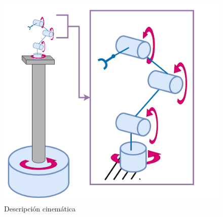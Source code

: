 \begin{figure}[H]
    \centering
    \includegraphics[scale=0.3]{Figures/Robotino_DescCin.png}
        \caption{Descripción cinemática}
        \label{fig:RobotinoDescCin}
\end{figure}
